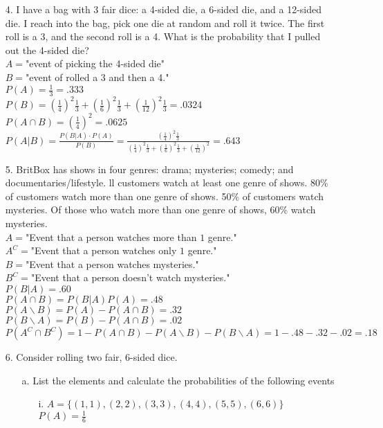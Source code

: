 \documentclass[11pt]{amsart}
\theoremstyle{definition}
\begin{document}
\begin{itemize}
\begin{itemize}
\end{itemize}

\item[4.] I have a bag with 3 fair dice: a 4-sided die, a 6-sided die, and a 12-sided die. I reach into the bag, pick one die at random and roll it twice. The first roll is a 3, and the second roll is a 4. What is the probability that I pulled out the 4-sided die? \\
$A=$"event of picking the 4-sided die" \\
$B=$"event of rolled a 3 and then a 4." \\
$P(A)=\frac{1}{3}=.333$ \\
$P(B)=(\frac 14)^2\frac 13+(\frac16)^2\frac 13+(\frac 1{12})^2\frac 13=.0324$ \\
$P(A\cap B)=(\frac{1}{4})^2=.0625$ \\
$P(A|B)=\frac{P(B|A)\cdot P(A)}{P(B)}=\frac{(\frac{1}{4})^2\frac13}{(\frac 14)^2\frac 13+(\frac16)^2\frac 13+(\frac 1{12})^2}=.643$

\item[5.] BritBox has shows in four genres: drama; mysteries; comedy; and documentaries/lifestyle. ll customers watch at least one genre of shows. 80\% of customers watch more than one genre of shows. 50\% of customers watch mysteries. Of those who watch more than one genre of shows, 60\% watch mysteries. \\
$A=$"Event that a person watches more than $1$ genre." \\
$A^C=$"Event that a person watches only $1$ genre." \\
$B=$"Event that a person watches mysteries." \\
$B^C=$"Event that a person doesn't watch mysteries." \\
$P(B|A)=.60$ \\
$P(A\cap B)=P(B|A)P(A)=.48$ \\
$P(A\backslash B)=P(A)-P(A\cap B)=.32$ \\
$P(B\backslash A)=P(B)-P(A\cap B)=.02$ \\
$P(A^C\cap B^C)=1-P(A\cap B)-P(A\backslash B)-P(B\backslash A)=1-.48-.32-.02=.18$

\item[6.] Consider rolling two fair, 6-sided dice.
\begin{itemize}
    \item[a.] List the elements and calculate the probabilities of the following events
    \begin{itemize}
        \item[i.] $A=\{(1,1),(2,2),(3,3),(4,4),(5,5),(6,6)\}$ \\
                  $P(A)=\frac 16$


\end{itemize}
\end{itemize}
\end{itemize}
\end{document}
